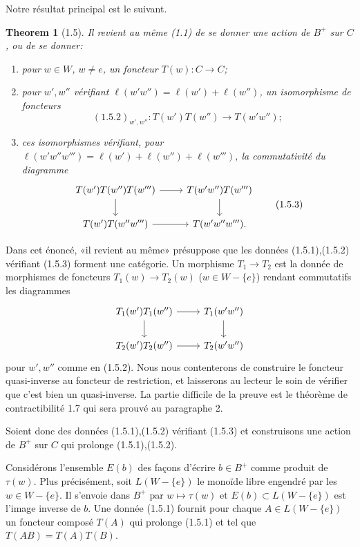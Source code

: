 \documentclass[11pt]{article}
\newtheorem{theorem}{Theorem}[section]
\begin{document}
Notre résultat principal est le suivant.

\begin{theorem}[1.5]
Il revient au même (1.1) de se donner une action de $B^+$ sur $C$, ou de se donner:
\begin{enumerate}[label=(1.5.\arabic*)]
\item pour $w\in W$, $w\ne e$, un foncteur $T(w):C\to C$;
\item pour $w',w''$ vérifiant $\ell(w'w'')=\ell(w')+\ell(w'')$, un isomorphisme de foncteurs
\[
 (1.5.2)_{w',w''}:T(w')T(w'')\longrightarrow T(w'w'');
\]
\item ces isomorphismes vérifiant, pour $\ell(w'w''w''')=\ell(w')+\ell(w'')+\ell(w''')$, la commutativité du diagramme
\[
\begin{tikzcd}
 T(w')T(w'')T(w''') \arrow[r] \arrow[d] & T(w'w'')T(w''') \arrow[d]\\
 T(w')T(w''w''') \arrow[r] & T(w'w''w''').
\end{tikzcd}
\tag{1.5.3}
\]
\end{enumerate}
\end{theorem}
Dans cet énoncé, «il revient au même» présuppose que les données (1.5.1),(1.5.2) vérifiant (1.5.3) forment une catégorie. Un morphisme $T_1\to T_2$ est la donnée de morphismes de foncteurs $T_1(w)\to T_2(w)$ ($w\in W-\{e\}$) rendant commutatifs les diagrammes
\[
\begin{tikzcd}
T_1(w')T_1(w'') \arrow[r] \arrow[d] & T_1(w'w'') \arrow[d]\\
T_2(w')T_2(w'') \arrow[r] & T_2(w'w'')
\end{tikzcd}
\]
pour $w',w''$ comme en (1.5.2). Nous nous contenterons de construire le foncteur quasi-inverse au foncteur de restriction, et laisserons au lecteur le soin de vérifier que c'est bien un quasi-inverse. La partie difficile de la preuve est le théorème de contractibilité 1.7 qui sera prouvé au paragraphe 2.

Soient donc des données (1.5.1),(1.5.2) vérifiant (1.5.3) et construisons une action de $B^+$ sur $C$ qui prolonge (1.5.1),(1.5.2).

Considérons l'ensemble $E(b)$ des façons d'écrire $b\in B^+$ comme produit de $\tau(w)$. Plus précisément, soit $L(W-\{e\})$ le monoïde libre engendré par les $w\in W-\{e\}$. Il s'envoie dans $B^+$ par $w\mapsto\tau(w)$ et $E(b)\subset L(W-\{e\})$ est l'image inverse de $b$. Une donnée (1.5.1) fournit pour chaque $A\in L(W-\{e\})$ un foncteur composé $T(A)$ qui prolonge (1.5.1) et tel que $T(AB)=T(A)T(B)$.
\end{document}

